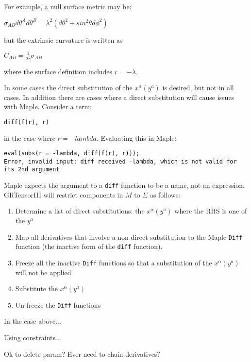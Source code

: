 \documentclass{article}
\begin{document}
For example, a null surface metric may be:
\begin{center}
$\sigma_{AB} d\theta^A d\theta^B = \lambda^2 \left(d\theta^2 + sin^2 \theta d\phi^2 \right)$
\end{center}
but the extrinsic curvature is written as 
\begin{center}
$C_{AB} = \frac{1}{2r} \sigma_{AB}$
\end{center}
where the surface definition includes $r=-\lambda$.

In some cases the direct substitution of the $x^\alpha(y^a)$ is desired, but not in all cases. In addition there are cases where
a direct substitution will cause issues with Maple. Consider a term:
\begin{center}
\texttt{diff(f(r), r)}
\end{center}
in the case where $r=-lambda$. Evaluating this in Maple:
\begin{center}
\begin{verbatim}
eval(subs(r = -lambda, diff(f(r), r)));
Error, invalid input: diff received -lambda, which is not valid for its 2nd argument
\end{verbatim}
\end{center}
Maple expects the argument to a \texttt{diff} function to be a name, not an expression. \\

GRTensorIII will restrict components in $M$ to $\Sigma$ as follows:
\begin{enumerate}
\item Determine a list of direct substitutions: the $x^\alpha(y^a)$ where the RHS is one of the $y^a$
\item Map all derivatives that involve a non-direct substitution to the Maple \texttt{Diff} function (the
inactive form of the \texttt{diff} function). 
\item Freeze all the inactive \texttt{Diff} functions so that a substitution of the $x^\alpha(y^a)$ will not 
be applied
\item Substitute the $x^\alpha(y^a)$
\item Un-freeze the \texttt{Diff} functions
\end{enumerate}

In the case above...

Using constraints...

Ok to delete param? Ever need to chain derivatives?

\end{document}
